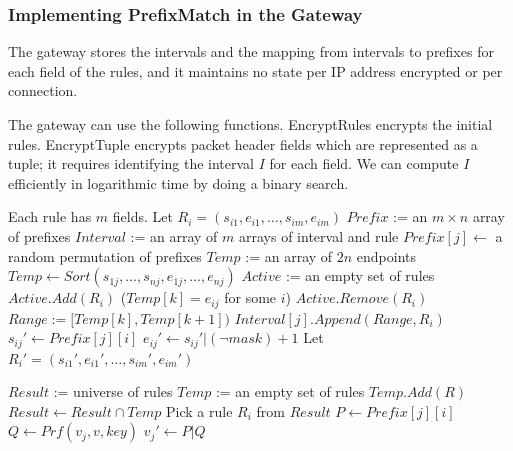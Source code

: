 \subsubsection{Implementing PrefixMatch in the Gateway}
\label{sec:tree}

The gateway stores the intervals and the mapping from intervals to prefixes for each field of the rules, and it maintains no state per IP address encrypted or per connection.

The gateway can use the following functions. EncryptRules encrypts the initial rules. EncryptTuple encrypts packet header fields which are represented as a tuple; it requires identifying the interval $I$ for each field. We can compute $I$ efficiently in logarithmic time by doing a binary search. 

\begin{framed}
\begin{algorithmic}[1]

  \State Each rule has $m$ fields. Let $R_i = (s_{i1}, e_{i1}, \dots, s_{im}, e_{im})$
  \State $Prefix$ := an $m \times n$ array of prefixes 
  \State $Interval$ := an array of $m$ arrays of interval and rule
    \State $Prefix[j] \gets$ a random permutation of prefixes
    \State $Temp$ := an array of $2n$ endpoints
    \State $Temp \gets Sort(s_{1j}, \dots, s_{nj}, e_{1j}, \dots, e_{nj})$
    \State $Active$ := an empty set of rules
        \State $Active.Add(R_i)$
      \Else
        \State ($Temp[k] = e_{ij}$ for some $i$)
        \State $Active.Remove(R_i)$
      \EndIf
      \State $Range := [Temp[k], Temp[k+1])$
        \State $Interval[j].Append(Range, R_i)$
      \EndFor
    \EndFor
  \EndFor
      \State $s_{ij}' \gets Prefix[j][i]$
      \State $e_{ij}' \gets s_{ij}' | (\lnot mask) + 1$
    \EndFor
    \State Let $R_i' = (s_{i1}', e_{i1}', \dots, s_{im}', e_{im}')$
  \EndFor
  \State {}
\EndProcedure

  \State $Result$ := universe of rules
    \State $Temp$ := an empty set of rules
      \State $Temp.Add(R)$
    \EndFor
    \State $Result \gets Result \cap Temp$
  \EndFor
  \State Pick a rule $R_i$ from $Result$ 
    \State $P \gets Prefix[j][i]$
    \State $Q \gets Prf(v_j, v, key)$
    \State $v_j' \gets P | Q $ 
  \EndFor
  \State {}
\EndProcedure

\end{algorithmic}
\end{framed}



